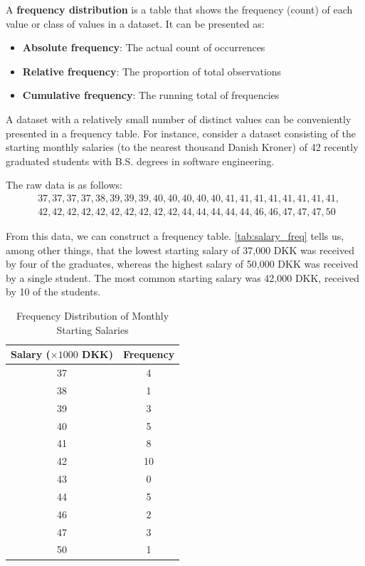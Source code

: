\begin{definition}
A \textbf{frequency distribution} is a table that shows the frequency (count) of each value or class of values in a dataset. It can be presented as:
\begin{itemize}
    \item \textbf{Absolute frequency}: The actual count of occurrences
    \item \textbf{Relative frequency}: The proportion of total observations
    \item \textbf{Cumulative frequency}: The running total of frequencies
\end{itemize}
\end{definition}

\begin{example}
A dataset with a relatively small number of distinct values can be conveniently presented in a frequency table. For instance, consider a dataset consisting of the starting monthly salaries (to the nearest thousand Danish Kroner) of 42 recently graduated students with B.S. degrees in software engineering.

The raw data is as follows:
\[
\begin{aligned}
&37, 37, 37, 37, 38, 39, 39, 39, 40, 40, 40, 40, 40, 41, 41, 41, 41, 41, 41, 41, 41, \\
&42, 42, 42, 42, 42, 42, 42, 42, 42, 42, 44, 44, 44, 44, 44, 46, 46, 47, 47, 47, 50
\end{aligned}
\]

From this data, we can construct a frequency table. \autoref{tab:salary_freq} tells us, among other things, that the lowest starting salary of 37,000 DKK was received by four of the graduates, whereas the highest salary of 50,000 DKK was received by a single student. The most common starting salary was 42,000 DKK, received by 10 of the students.

\begin{table}[h!]
\centering
\renewcommand{\arraystretch}{1.2}
{
\begin{tabular}{cc}
\toprule
\textbf{Salary (\(\times 1000\) DKK)} & \textbf{Frequency} \\
\midrule
37 & 4 \\
38 & 1 \\
39 & 3 \\
40 & 5 \\
41 & 8 \\
42 & 10 \\
43 & 0 \\
44 & 5 \\
46 & 2 \\
47 & 3 \\
50 & 1 \\
\bottomrule
\end{tabular}
}
\caption{Frequency Distribution of Monthly Starting Salaries}
\label{tab:salary_freq}
\end{table}
\end{example}

